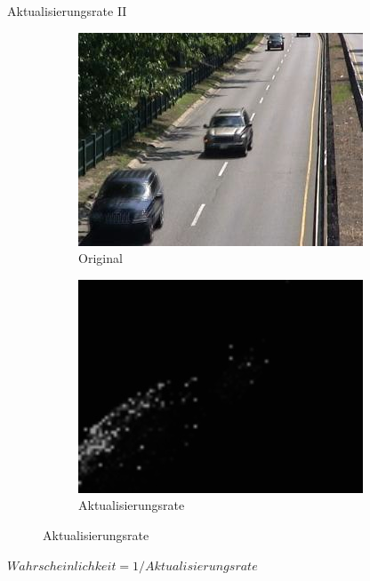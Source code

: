 \documentclass[hyperref={pdfpagelabels=false}]{beamer}
\begin{document}
\begin{frame}{Aktualisierungsrate II}
	\begin{figure}
		\captionsetup[subfigure]{labelformat=empty}
		\begin{subfigure}{.4\linewidth}
			\centering
			\includegraphics[width=\linewidth]{./Bilder/update_bilder/orig1198}
			\caption{Original}
		\end{subfigure}
		\hspace{10mm}
		\begin{subfigure}{.4\linewidth}
			\centering
			\includegraphics[width=\linewidth]{./Bilder/update_bilder/updatearr1198}
			\caption{Aktualisierungsrate}
		\end{subfigure}
	\end{figure}
	\vspace{1em}
	\begin{center}
		\Large
		$ Wahrscheinlichkeit = 1/Aktualisierungsrate $
	\end{center}
\end{frame}
\end{document}
